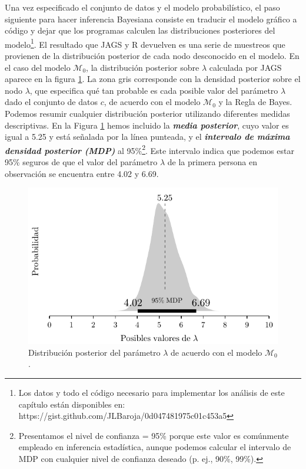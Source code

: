 \documentclass{article}
\begin{document}
\indent Una vez especificado el conjunto de datos y el modelo probabilístico, el paso siguiente para hacer inferencia Bayesiana consiste en traducir el modelo gráfico a código y dejar que los programas calculen las distribuciones posteriores del modelo\footnote{Los datos y todo el código necesario para implementar los análisis de este capítulo están disponibles en: https://gist.github.com/JLBaroja/0d047481975c01c453a5}. El resultado que JAGS y R devuelven es una serie de muestreos que provienen de la distribución posterior de cada nodo desconocido en el modelo. En el caso del modelo $\mathcal M_0$, la distribución posterior sobre $\lambda$ calculada por JAGS aparece en la figura \ref{fig:lambda_m0}. La zona gris corresponde con la densidad posterior sobre el nodo $\lambda$, que especifica qué tan probable es cada posible valor del parámetro $\lambda$ dado el conjunto de datos $c$, de acuerdo con el modelo $\mathcal M_0$ y la Regla de Bayes. Podemos resumir cualquier distribución posterior utilizando diferentes medidas descriptivas. En la Figura \ref{fig:lambda_m0} hemos incluido la \emph{\textbf{media posterior}}, cuyo valor es igual a 5.25 y está señalada por la línea punteada, y el \emph{\textbf{intervalo de máxima densidad posterior (MDP)}} al 95\%\footnote{Presentamos el nivel de confianza = 95\% porque este valor es comúnmente empleado en inferencia estadística, aunque podemos calcular el intervalo de MDP con cualquier nivel de confianza deseado (p. ej., 90\%, 99\%).}. Este intervalo indica que podemos estar 95\% seguros de que el valor del parámetro $\lambda$ de la primera persona en observación se encuentra entre 4.02 y 6.69.

\begin{figure}[H]
\centerline{\includegraphics[width=1\textwidth]{lambda_m0.pdf}}
\caption{Distribución posterior del parámetro $\lambda$ de acuerdo con el modelo $\mathcal M_0$.}
\label{fig:lambda_m0}
\end{figure}
\end{document}
